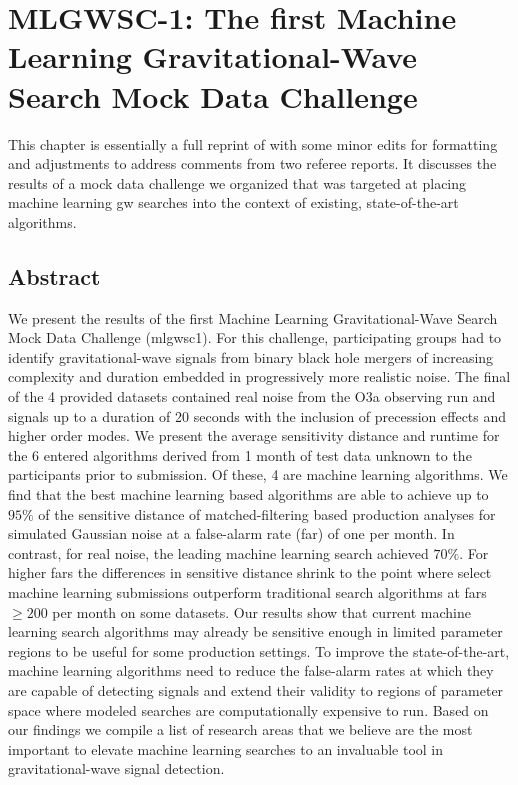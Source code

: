 \chapter{MLGWSC-1: The first Machine Learning Gravitational-Wave Search Mock Data Challenge}\label{ch:mlgwsc1}
\minitoc
This chapter is essentially a full reprint of \cite{Schafer:2022dxv} with some minor edits for formatting and adjustments to address comments from two referee reports. It discusses the results of a mock data challenge we organized that was targeted at placing machine learning \acrshort{gw} searches into the context of existing, state-of-the-art algorithms.

\setcounter{section}{-1}
\section{Abstract}
We present the results of the first Machine Learning Gravitational-Wave Search Mock Data Challenge (\acrshort{mlgwsc1}). For this challenge, participating groups had to identify gravitational-wave signals from binary black hole mergers of increasing complexity and duration embedded in progressively more realistic noise. The final of the 4 provided datasets contained real noise from the O3a observing run and signals up to a duration of 20 seconds with the inclusion of precession effects and higher order modes. We present the average sensitivity distance and runtime for the 6 entered algorithms derived from 1 month of test data unknown to the participants prior to submission. Of these, 4 are machine learning algorithms. We find that the best machine learning based algorithms are able to achieve up to $95\%$ of the sensitive distance of matched-filtering based production analyses for simulated Gaussian noise at a false-alarm rate (\acrshort{far}) of one per month. In contrast, for real noise, the leading machine learning search achieved $70\%$. For higher \acrshort{far}s the differences in sensitive distance shrink to the point where select machine learning submissions outperform traditional search algorithms at \acrshort{far}s $\geq 200$ per month on some datasets. Our results show that current machine learning search algorithms may already be sensitive enough in limited parameter regions to be useful for some production settings. To improve the state-of-the-art, machine learning algorithms need to reduce the false-alarm rates at which they are capable of detecting signals and extend their validity to regions of parameter space where modeled searches are computationally expensive to run. Based on our findings we compile a list of research areas that we believe are the most important to elevate machine learning searches to an invaluable tool in gravitational-wave signal detection.

